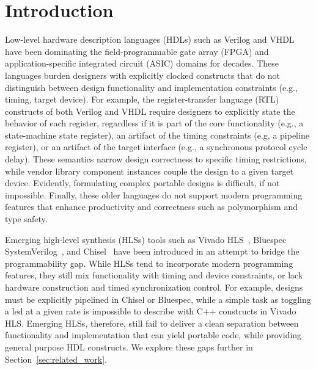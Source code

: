 \section{Introduction}


Low-level hardware description languages (HDLs) such as Verilog and VHDL have been dominating the field-programmable gate array (FPGA) and application-specific integrated circuit (ASIC) domains for decades.
These languages burden designers with explicitly clocked constructs that do not distinguish between design functionality and implementation constraints (e.g., timing, target device).
For example, the register-transfer language (RTL) constructs of both Verilog and VHDL require designers to explicitly state the behavior of each register, regardless if it is part of the core functionality (e.g., a state-machine state register), an artifact of the timing constraints (e.g, a pipeline register), or an artifact of the target interface (e.g., a synchronous protocol cycle delay).
%
These semantics narrow design correctness to specific timing restrictions, while vendor library component instances couple the design to a given target device. Evidently, formulating complex portable designs is difficult, if not impossible.
%
Finally, these older languages do not support modern programming features that enhance productivity and correctness such as polymorphism and type safety.

Emerging high-level synthesis (HLSs) tools such as Vivado HLS~\cite{Vivado2012}, Bluespec SystemVerilog~\cite{nikhil2004bluespec}, and Chisel~\cite{Bachrach2012} have been introduced in an attempt to bridge the programmability gap.
While HLSs tend to incorporate modern programming features, they still mix functionality with timing and device constraints, or lack hardware construction and timed synchronization control. For example, designs must be explicitly pipelined in Chisel or Bluespec, while a simple task as toggling a led at a given rate is impossible to describe with C++ constructs in Vivado HLS.
Emerging HLSs, therefore, still fail to deliver a clean separation between functionality and implementation that can yield portable code, while providing general purpose HDL constructs. We explore these gaps further in Section~\ref{sec:related_work}.

